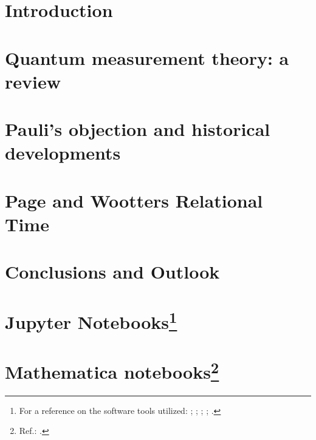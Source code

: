 \mainmatter

\chapter{Introduction}\label{ch:intro}



\chapter{Quantum measurement theory: a review}\label{ch:decohere}





%



\chapter{Pauli's objection and historical developments}\label{ch:hist}






\chapter{Page and Wootters Relational Time}\label{ch:pw}\label{ch:detect}








\chapter{Conclusions and Outlook}\label{ch:outlook}




\appendix

\chapter[Jupyter Notebooks]{Jupyter Notebooks\footnote{
  For a reference on the software tools utilized:
  \cite{comp:scipy};
  \cite{comp:sympy};
  \cite{comp:jupyter};
  \cite{comp:matplotlib};
  \cite{comp:numpy}.
}}






\chapter[Mathematica notebooks]{Mathematica notebooks\footnote{
  Ref.: \cite{Wolfram}.
}}



\printbibliography[heading=bibintoc]


